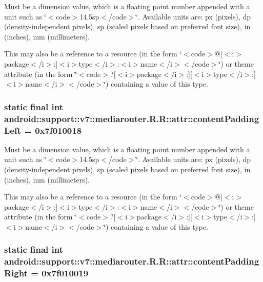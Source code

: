 Must be a dimension value, which is a floating point number appended with a unit such as \char`\"{}$<$code$>$14.5sp$<$/code$>$\char`\"{}. Available units are: px (pixels), dp (density-independent pixels), sp (scaled pixels based on preferred font size), in (inches), mm (millimeters). 

This may also be a reference to a resource (in the form \char`\"{}$<$code$>$@\mbox{[}$<$i$>$package$<$/i$>$:\mbox{]}$<$i$>$type$<$/i$>$:$<$i$>$name$<$/i$>$$<$/code$>$\char`\"{}) or theme attribute (in the form \char`\"{}$<$code$>$?\mbox{[}$<$i$>$package$<$/i$>$:\mbox{]}\mbox{[}$<$i$>$type$<$/i$>$:\mbox{]}$<$i$>$name$<$/i$>$$<$/code$>$\char`\"{}) containing a value of this type. \hypertarget{classandroid_1_1support_1_1v7_1_1mediarouter_1_1_r_1_1attr_af7df35e229adce163aedc1a3a5a3e25}{
\subsubsection[{contentPaddingLeft}]{\setlength{\rightskip}{0pt plus 5cm}static final int android::support::v7::mediarouter.R.R::attr::contentPaddingLeft = 0x7f010018}}
\label{classandroid_1_1support_1_1v7_1_1mediarouter_1_1_r_1_1attr_af7df35e229adce163aedc1a3a5a3e25}


Must be a dimension value, which is a floating point number appended with a unit such as \char`\"{}$<$code$>$14.5sp$<$/code$>$\char`\"{}. Available units are: px (pixels), dp (density-independent pixels), sp (scaled pixels based on preferred font size), in (inches), mm (millimeters). 

This may also be a reference to a resource (in the form \char`\"{}$<$code$>$@\mbox{[}$<$i$>$package$<$/i$>$:\mbox{]}$<$i$>$type$<$/i$>$:$<$i$>$name$<$/i$>$$<$/code$>$\char`\"{}) or theme attribute (in the form \char`\"{}$<$code$>$?\mbox{[}$<$i$>$package$<$/i$>$:\mbox{]}\mbox{[}$<$i$>$type$<$/i$>$:\mbox{]}$<$i$>$name$<$/i$>$$<$/code$>$\char`\"{}) containing a value of this type. \hypertarget{classandroid_1_1support_1_1v7_1_1mediarouter_1_1_r_1_1attr_7be343fd6d602136716ae90a7a3ae20a}{
\subsubsection[{contentPaddingRight}]{\setlength{\rightskip}{0pt plus 5cm}static final int android::support::v7::mediarouter.R.R::attr::contentPaddingRight = 0x7f010019}}
\label{classandroid_1_1support_1_1v7_1_1mediarouter_1_1_r_1_1attr_7be343fd6d602136716ae90a7a3ae20a}


